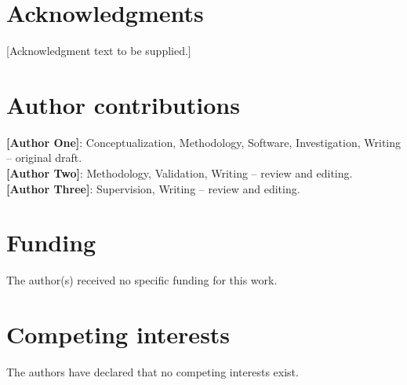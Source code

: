 \documentclass[10pt,letterpaper]{article}
\begin{document}


\section*{Acknowledgments}
[Acknowledgment text to be supplied.]

\section*{Author contributions}
\textbf{[Author One]}: Conceptualization, Methodology, Software, Investigation, Writing -- original draft.\\
\textbf{[Author Two]}: Methodology, Validation, Writing -- review and editing.\\
\textbf{[Author Three]}: Supervision, Writing -- review and editing.

\section*{Funding}
The author(s) received no specific funding for this work. %

\section*{Competing interests}
The authors have declared that no competing interests exist. %
\end{document}
